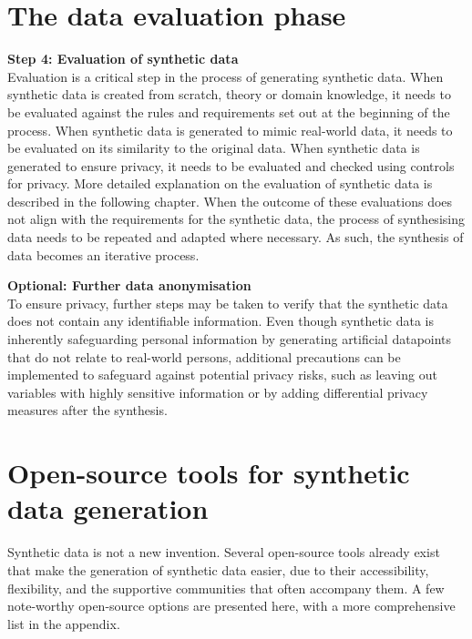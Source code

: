 
\section{The data evaluation phase}

\textbf{Step 4: Evaluation of synthetic data} \\
Evaluation is a critical step in the process of generating synthetic data. When synthetic data is created from scratch, theory or domain knowledge, it needs to be evaluated against the rules and requirements set out at the beginning of the process. When synthetic data is generated to mimic real-world data, it needs to be evaluated on its similarity to the original data. When synthetic data is generated to ensure privacy, it needs to be evaluated and checked using controls for privacy. More detailed explanation on the evaluation of synthetic data is described in the following chapter. When the outcome of these evaluations does not align with the requirements for the synthetic data, the process of synthesising data needs to be repeated and adapted where necessary. As such, the synthesis of data becomes an iterative process.


\textbf{Optional: Further data anonymisation} \\
To ensure privacy, further steps may be taken to verify that the synthetic data does not contain any identifiable information. Even though synthetic data is inherently safeguarding personal information by generating artificial datapoints that do not relate to real-world persons, additional precautions can be implemented to safeguard against potential privacy risks, such as leaving out variables with highly sensitive information or by adding differential privacy measures after the synthesis. 




\section{Open-source tools for synthetic data generation}

Synthetic data is not a new invention. Several open-source tools already exist that make the generation of synthetic data easier, due to their accessibility, flexibility, and the supportive communities that often accompany them. A few note-worthy open-source options are presented here, with a more comprehensive list in the appendix.

